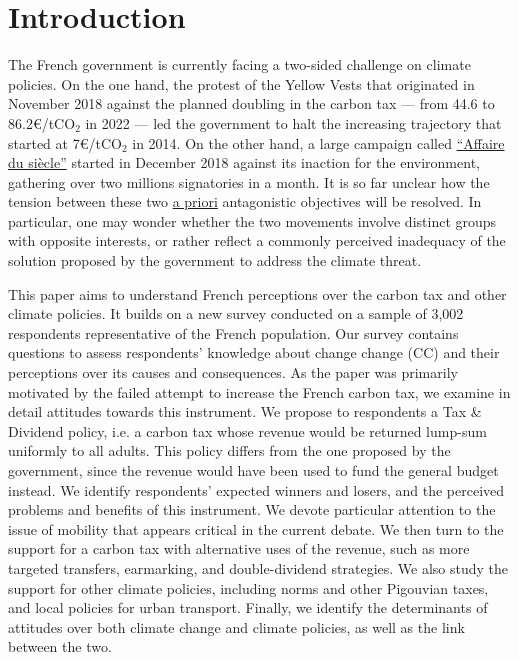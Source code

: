 \documentclass[english,5p,authoryear]{elsarticle}
\begin{document}
\setcounter{tocdepth}{2}

\vfill\eject 

\section{Introduction}

The French government is currently facing a two-sided challenge on climate policies. On the one hand, the protest of the Yellow Vests that originated in November 2018 against the planned doubling in the carbon tax  --- from 44.6 to 86.2\euro{}/tCO$_2$ in 2022 --- led the government to halt the increasing trajectory that started at 7\euro{}/tCO$_2$ in 2014. On the other hand, a large campaign called \href{https://laffairedusiecle.net/}{``Affaire du siècle''} started in December 2018 against its inaction for the environment, gathering over two millions signatories in a month. It is so far unclear how the tension between these two \uline{a priori} antagonistic objectives will be resolved. In particular, one may wonder whether the two movements involve distinct groups with opposite interests, or rather reflect a commonly perceived inadequacy of the solution proposed by the government to address the climate threat.


This paper aims to understand French perceptions over the carbon tax and other climate policies. It builds on a new survey conducted on a sample of 3,002 respondents representative of the French population. Our survey contains questions to assess respondents' knowledge about change change (CC) and their perceptions over its causes and consequences. As the paper was primarily motivated by the failed attempt to increase the French carbon tax, we examine in detail attitudes towards this instrument. We propose to respondents a Tax \& Dividend policy, i.e. a carbon tax whose revenue would be returned lump-sum uniformly to all adults. This policy differs from the one proposed by the government, since the revenue would have been used to fund the general budget instead. We identify respondents' expected winners and losers, and the perceived problems and benefits of this instrument. We devote particular attention to the issue of mobility that appears critical in the current debate. We then turn to the support for a carbon tax with alternative uses of the revenue, such as more targeted transfers, earmarking, and double-dividend strategies. We also study the support for other climate policies, including norms and other Pigouvian taxes, and local policies for urban transport. Finally, we identify the determinants of attitudes over both climate change and climate policies, as well as the link between the two.
\end{document}
